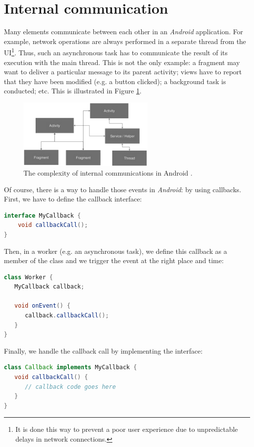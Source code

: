 \documentclass[a4paper, oneside, 11pt]{book}
\begin{document}
\section{Internal communication}
Many elements communicate between each other in an \textit{Android} application. For example, network operations are always performed in a separate thread from the UI\footnote{It is done this way to prevent  a poor user experience due to unpredictable delays in network connections.}. Thus, such an asynchronous task has to communicate the result of its execution with the main thread. This is not the only example: a fragment may want to deliver a particular message to its parent activity; views have to report that they have been modified (e.g. a button clicked); a background task is conducted; etc. This is illustrated in Figure \ref{fig:status_quo}.

\begin{figure}[htbp]
	\centerline{\includegraphics[width=0.6\textwidth]{status_quo.png}}
	\caption{The complexity of internal communications in Android \cite{Eventbusslide:online}.}
	\label{fig:status_quo}
\end{figure}

Of course, there is a way to handle those events in \textit{Android}: by using callbacks.  First, we have to define the callback interface:
\begin{lstlisting}[language=java]
interface MyCallback {
    void callbackCall();
}
\end{lstlisting}
Then, in a worker (e.g. an asynchronous task), we define this callback as a member of the class and we trigger the event at the right place and time:
\begin{lstlisting}[language=java]
class Worker {
   MyCallback callback;

   void onEvent() {
      callback.callbackCall();
   }
}
\end{lstlisting}
Finally, we handle the callback call by implementing the interface:
\begin{lstlisting}[language=java]
class Callback implements MyCallback {
   void callbackCall() {
      // callback code goes here
   }
}
\end{lstlisting}
\end{document}

